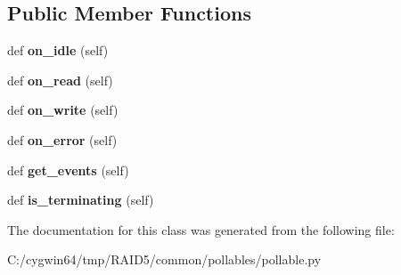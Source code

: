 \subsection*{Public Member Functions}
\begin{DoxyCompactItemize}
\item 
\mbox{\label{class_r_a_i_d5_1_1common_1_1pollables_1_1pollable_1_1_pollable_af261ececf5f5e21d95611e7a1a9b01e3}} 
def {\bfseries on\+\_\+idle} (self)
\item 
\mbox{\label{class_r_a_i_d5_1_1common_1_1pollables_1_1pollable_1_1_pollable_a9a989d7ddd2aa7ffcaa349c0e9f47880}} 
def {\bfseries on\+\_\+read} (self)
\item 
\mbox{\label{class_r_a_i_d5_1_1common_1_1pollables_1_1pollable_1_1_pollable_ac98ba12dcc8968d74b0b11bc083315de}} 
def {\bfseries on\+\_\+write} (self)
\item 
\mbox{\label{class_r_a_i_d5_1_1common_1_1pollables_1_1pollable_1_1_pollable_ad31d3a7892af98c5e5e51e1bbb69b7b0}} 
def {\bfseries on\+\_\+error} (self)
\item 
\mbox{\label{class_r_a_i_d5_1_1common_1_1pollables_1_1pollable_1_1_pollable_a14860df1cb88e4cfa7e5ce0a066e55c6}} 
def {\bfseries get\+\_\+events} (self)
\item 
\mbox{\label{class_r_a_i_d5_1_1common_1_1pollables_1_1pollable_1_1_pollable_aad042c9fbe6554403349310be32824c7}} 
def {\bfseries is\+\_\+terminating} (self)
\end{DoxyCompactItemize}


The documentation for this class was generated from the following file\+:\begin{DoxyCompactItemize}
\item 
C\+:/cygwin64/tmp/\+R\+A\+I\+D5/common/pollables/pollable.\+py\end{DoxyCompactItemize}
